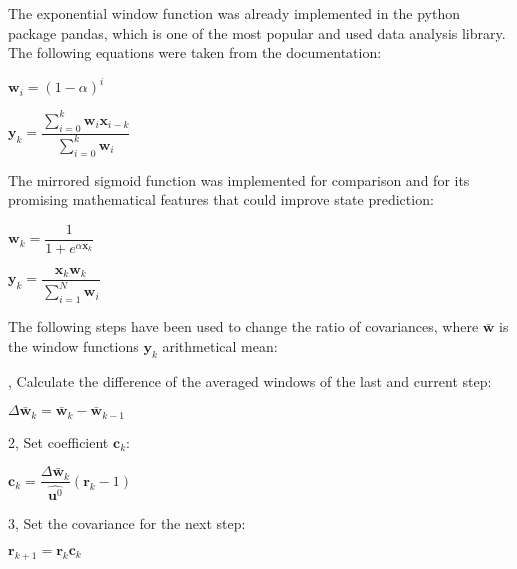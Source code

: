 \documentclass[class=article, crop=false]{standalone}
\begin{document}
The exponential window function was already implemented in the python package pandas, which is one of the most popular and used data analysis library. The following equations were taken from the documentation\footnotemark:


\vspace{0.5cm}

\begin{center}

$ \textbf{w}_i = (1 - \alpha)^i $

\vspace{0.5cm}
$ \textbf{y}_k = \dfrac{\sum_{i=0}^{k} \textbf{w}_i \textbf{x}_{i-k}}{ \sum_{i=0}^{k} \textbf{w}_i} $

\end{center}

\vspace{0.5cm}

The mirrored sigmoid function was implemented for comparison and for its promising mathematical features that could improve state prediction:
\vspace{0.5cm}

\begin{center}

$ \textbf{w}_k = \dfrac{ 1 }{ 1 + e^{\alpha \textbf{x}_k} } $ \\

\vspace{0.5cm}

$ \textbf{y}_k = \dfrac{\textbf{x}_k \textbf{w}_k}{ \sum_{i=1}^{N} \textbf{w}_i } $

\end{center}

\vspace{0.5cm}

The following steps have been used to change the ratio of covariances, where $ \bar{\textbf{w}} $ is the window functions $ \textbf{y}_k $ arithmetical mean:
\vspace{0.5cm}

, Calculate the difference of the averaged windows of the last and current step:
\begin{center}
$ \Delta \bar{\textbf{w}}_k = \bar{\textbf{w}}_k - \bar{\textbf{w}}_{k-1} $
\end{center}
\vspace{0.5cm}
2, Set coefficient $ \textbf{c}_k $:
\begin{center}
$ \textbf{c}_k = \dfrac{\Delta \bar{\textbf{w}}_k}{\hat{\textbf{u}^0}} (\textbf{r}_k - 1) $
\end{center}
\vspace{0.5cm}
3, Set the covariance for the next step:
\begin{center}
$ \textbf{r}_{k+1} = \textbf{r}_{k} \textbf{c}_k $
\end{center}
\end{document}

